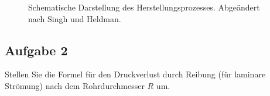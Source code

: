 \documentclass[a4paper,11pt]{article}
\newif\ifshowme
\begin{document}
\begin{figure}[h]
{
}

\caption{Schematische Darstellung des Herstellungsprozesses. Abgeändert nach Singh und Heldman.}
\label{masse}
\end{figure}



\ifshowme
\antwort{
Produkt $P$:
\begin{align*}
F = D + W + K + P
\end{align*}
Für die Trockensubstanz gilt:
\begin{align*}
0,15 F &=  0 D + 0 W +0,2 K + 0,8 P \\
0,15 F &=  0 + 0 +0,2 \cdot 450 + 0,8 P \\
150 &= 90 + 0,8 P \\
P &= 75 ~\text{kg/h}
\end{align*}
Rücklauf $A$:
\begin{align*}
E &= A + K \\
0,1 E &= 0,05 A + 0,2 K \\
0,1 (A+K) &= 0,05 A + 90 \\ 
0,1 + 45 &= 0,05 A + 90 \\
0,05 A &= 45 \\
A &= 900 ~\text{kg/h}\\ \\
E &= 1.350 ~\text{kg/h}
\end{align*}
}
\else
\pagebreak
\fi

\subsection*{Aufgabe 2}
Stellen Sie die Formel für den Druckverlust durch Reibung (für laminare Strömung) nach dem Rohrdurchmesser $R$ um.
\end{document}
